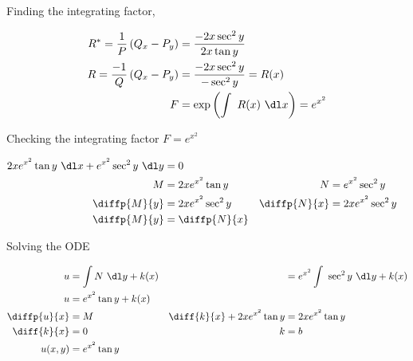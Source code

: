 \begin{enumerate}
          Finding the integrating factor,

          \begin{align}
              R^{*} = \frac{1}{P} \left( Q_{x} - P_{y} \right) & = \frac{- 2x \sec ^{2}y}{2x \tan y}                 \\
              R = \frac{-1}{Q}\left( Q_{x} - P_{y} \right)     & = \frac{- 2x \sec ^{2}y}{- \sec ^{2} y}  = R(x)     \\
              F                                                & = \exp \left( \int\ R(x)\ \dl x \right) = e^{x^{2}}
          \end{align}

          Checking the integrating factor $ F = e^{x^{2}} $

          \begin{align}
              2x e^{x^{2}} \tan y\ \dl x + e^{x^{2}} \sec ^{2} y\ \dl y & = 0                                                                    \\
              M                                                         & = 2x e^{x^{2}} \tan y      & N            & =  e^{x^{2}} \sec ^{2} y   \\
              \diffp{M}{y}                                              & = 2x e^{x^{2}} \sec ^{2} y & \diffp{N}{x} & = 2x e^{x^{2}} \sec ^{2} y \\
              \diffp{M}{y}                                              & = \diffp{N}{x}
          \end{align}

          Solving the ODE

          \begin{align}
              u            & = \int N\ \dl y+ k(x)     &                                  & = e^{x^{2}} \int\ \sec ^{2} y\ \dl y+ k(x) \\
              u            & = e^{x^{2}} \tan y + k(x)                                                                                 \\
              \diffp{u}{x} & = M                       & \diff{k}{x} + 2xe^{x^{2}} \tan y & =  2xe^{x^{2}} \tan y                      \\
              \diff{k}{x}  & = 0                       & k                                & = b                                        \\
              u(x, y)      & = e^{x^{2}} \tan y
          \end{align}



\end{enumerate}
